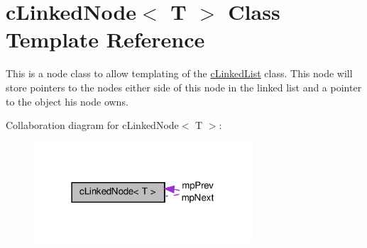 \hypertarget{classc_linked_node}{
\section{cLinkedNode$<$ T $>$ Class Template Reference}
\label{classc_linked_node}
}


This is a node class to allow templating of the \hyperlink{classc_linked_list}{cLinkedList} class. This node will store pointers to the nodes either side of this node in the linked list and a pointer to the object his node owns.  




Collaboration diagram for cLinkedNode$<$ T $>$:\nopagebreak
\begin{figure}[H]
\begin{center}
\leavevmode
\includegraphics[width=231pt]{classc_linked_node__coll__graph}
\end{center}
\end{figure}

